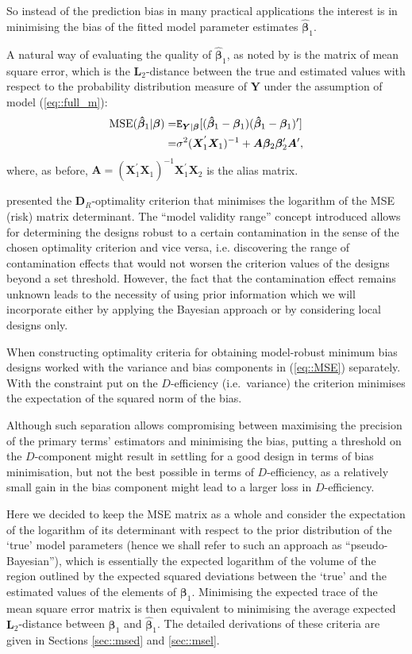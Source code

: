 So instead of the prediction bias in many practical applications the interest is in minimising the bias of the fitted model parameter estimates $\bm{\hat{\beta}}_{1}$.

A natural way of evaluating the quality of $\bm{\hat{\beta}}_{1}$, as noted by \citet{FedorovMontepiedra1997} is the matrix of  mean square error, which is the $\bm{L}_2$-distance between the true and estimated values with respect to the probability distribution measure of $\bm{Y}$ under the assumption of model (\ref{eq::full_m}):
\begin{align}
\label{eq::MSE}
\mbox{MSE}(\bm{\hat{\beta}}_1|\bm{\beta})=&\mathtt{E}_{\bm{Y}|\bm{\beta}}[(\bm{\hat{\beta}}_1-\bm{\beta}_1)(\bm{\hat{\beta}}_1-\bm{\beta}_1)']\notag\\=&\sigma^2(\bm{X}_1^{'}\bm{X}_1)^{-1}+\bm{A}\bm{\beta}_2\bm{\beta}_2'\bm{A}', 
\end{align}
where, as before, $\bm{A}=(\bm{X}_1^{'}\bm{X}_1)^{-1}\bm{X}_1^{'}\bm{X}_2$ is the alias matrix.

\citet{Fedorov1998optimal} presented the $\bm{D}_R$-optimality criterion that minimises the logarithm of the MSE (risk) matrix determinant. The ``model validity range'' concept introduced allows for determining the designs robust to a certain contamination in the sense of the chosen optimality criterion and vice versa, i.e. discovering the range of contamination effects that would not worsen the criterion values of the designs beyond a set threshold. However, the fact that the contamination effect remains unknown leads to the necessity of using prior information which we will incorporate either by applying the Bayesian approach or by considering local designs only.

When constructing optimality criteria for obtaining model-robust minimum bias designs \citet{jones2011efficient} worked with the variance and bias components in (\ref{eq::MSE}) separately. With the constraint put on the $D$-efficiency (i.e.~variance) the criterion minimises the expectation of the squared norm of the bias.   
   
Although such separation allows compromising between maximising the precision of the primary terms' estimators and minimising the bias, putting a threshold on the $D$-component might result in settling for a good design in terms of bias minimisation, but not the best possible in terms of $D$-efficiency, as a relatively small gain in the bias component might lead to a larger loss in $D$-efficiency.

Here we decided to keep the MSE matrix as a whole and consider the expectation of the logarithm of its determinant with respect to the prior distribution of the `true' model parameters (hence we shall refer to such an approach as ``pseudo-Bayesian''), which is essentially the expected logarithm of the volume of the region outlined by the expected squared deviations between the `true' and the estimated values of the elements of $\bm{\beta}_1$. Minimising the expected trace of the mean square error matrix is then equivalent to minimising the average expected $\bm{L}_2$-distance between $\bm{\beta}_1$ and $\bm{\hat{\beta}}_1$. The detailed derivations of these criteria are given in Sections \ref{sec::msed} and \ref{sec::msel}.

